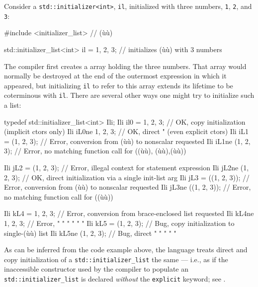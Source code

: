 Consider a \lstinline!std::initializer<int>!, \lstinline!il!, initialized with
three numbers, \lstinline!1!, \lstinline!2!, and \lstinline!3!:

\begin{emcppshiddenlisting}[emcppsbatch=e4]
#include <initializer_list>  // (ù{}ù)
\end{emcppshiddenlisting}
\begin{emcppslisting}[emcppsbatch=e4]
std::initializer_list<int> il = {1, 2, 3};  // initializes (ù{}ù) with 3 numbers
\end{emcppslisting}
    

\noindent The compiler first creates a  array holding the three
numbers. That array would normally be destroyed at the end of the
outermost expression in which it appeared, but initializing \lstinline!il!
to refer to this array extends its lifetime to be coterminous with
\lstinline!il!. There are several other ways one might try to initialize
such a list:

\begin{emcppslisting}[emcppsbatch=e4]
typedef std::initializer_list<int> Ili;
Ili il0 =  {1, 2, 3};   // OK, copy initialization (implicit ctors only)
Ili iL0ne  {1, 2, 3};   // OK, direct     "        (even explicit ctors)
Ili iL1 =  (1, 2, 3);   // Error, conversion from (ù{}ù) to nonscalar requested
Ili iL1ne  (1, 2, 3);   // Error, no matching function call for ((ù{}ù), (ù{}ù),(ù{}ù))

Ili jL2 = ({1, 2, 3});  // Error, illegal context for statement expression
Ili jL2ne ({1, 2, 3});  // OK, direct initialization via a single init-list arg
Ili jL3 = ((1, 2, 3));  // Error, conversion from (ù{}ù) to nonscalar requested
Ili jL3ne ((1, 2, 3));  // Error, no matching function call for ((ù{}ù))

Ili kL4 = {{1, 2, 3}};  // Error, conversion from brace-enclosed list requested
Ili kL4ne {{1, 2, 3}};  // Error,    "       "     "      "      "       "
Ili kL5 = {(1, 2, 3)};  // Bug, copy initialization to single-(ù{}ù) list
Ili kL5ne {(1, 2, 3)};  // Bug, direct       "      "    "      "     "
\end{emcppslisting}
    

\noindent As can be inferred from the code example above, the language treats
direct and copy initialization of a \lstinline!std::initializer_list! the
same --- i.e., as if the inaccessible constructor used by the compiler
to populate an \lstinline!std::initializer_list! is declared
\emph{without} the \lstinline!explicit! keyword; see .

